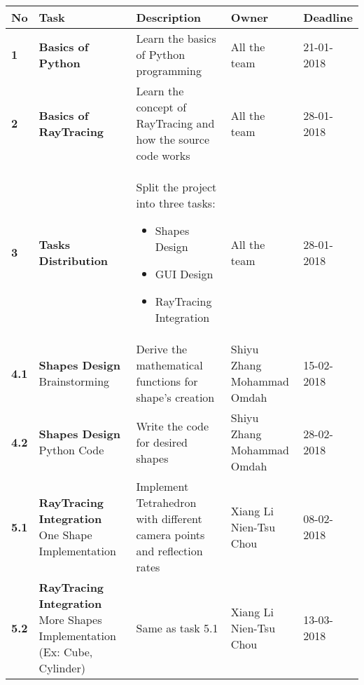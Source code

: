 \documentclass{article}
\begin{document}
\begin{center}
\hspace*{-3cm}
\begin{tabular}{|lp{4.5cm}p{5cm}p{3.5cm}l|}

\hline
\textbf{No} & \textbf{Task} & \textbf{Description} & \textbf{Owner} & \textbf{Deadline} \\
\hline
\textbf{1} & \textbf{Basics of Python} & Learn the basics of Python programming & All the team & 21-01-2018 \\

\textbf{2} &	\textbf{Basics of RayTracing} & Learn the concept of RayTracing and how the source code works & All the team & 28-01-2018 \\

\textbf{3} & \textbf{Tasks Distribution} & Split the project into three tasks:
\begin{itemize}
\item Shapes Design
\item GUI Design
\item RayTracing Integration
\end{itemize} & All the team & 28-01-2018 \\

\textbf{4.1} & \textbf{Shapes Design} \newline Brainstorming & Derive the mathematical functions for shape's creation & Shiyu Zhang \newline Mohammad Omdah & 15-02-2018 \\

\textbf{4.2} & \textbf{Shapes Design} \newline Python Code & Write the code for desired shapes & Shiyu Zhang \newline Mohammad Omdah & 28-02-2018 \\

\textbf{5.1} & \textbf{RayTracing Integration} \newline One Shape Implementation & Implement Tetrahedron with different camera points and reflection rates & Xiang Li \newline Nien-Tsu Chou & 08-02-2018 \\

\textbf{5.2} & \textbf{RayTracing Integration} \newline More Shapes Implementation (Ex: Cube, Cylinder) & Same as task 5.1 & Xiang Li \newline Nien-Tsu Chou & 13-03-2018 \\


\end{tabular}
\end{center}
\end{document}
